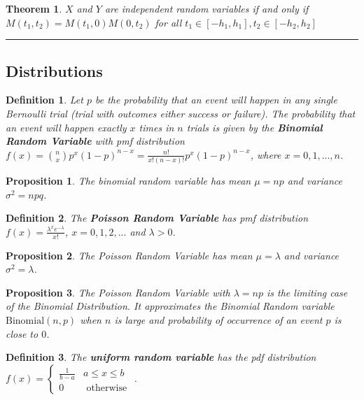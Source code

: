 \documentclass[14pt,twoside]{extreport}
\newcommand{\hhrule}{\vspace{1cm}\hrule\vspace{1cm}}
\theoremstyle{dotless}
\newtheorem*{defn}{Definition}
\newtheorem*{thm}{Theorem} %
\newtheorem*{prop}{Proposition} %
\begin{document}
\begin{thm}
    $X$ and $Y$ are independent random variables if and only if $M(t_1, t_2) = M(t_1, 0) M(0, t_2)$ for all $t_1 \in [-h_1, h_1], t_2 \in [-h_2, h_2]$
\end{thm}


\hhrule
\subsection*{Distributions}

\begin{defn}
    Let $p$ be the probability that an event will happen in any single Bernoulli trial (trial with outcomes either success or failure). The probability that an event will happen exactly $x$ times in $n$ trials is given by the \textbf{Binomial Random Variable} with pmf distribution $f(x) = {n \choose x} p^x (1-p)^{n-x} = \displaystyle \frac{n!}{x! (n-x)!} p^x (1-p)^{n-x}$, where $x = 0, 1, ... , n$.
\end{defn}

\begin{prop}
The binomial random variable has mean $\mu = np$ and variance $\sigma^2 = npq$.
\end{prop}

\begin{defn}
    The \textbf{Poisson Random Variable} has pmf distribution $f(x) = \displaystyle \frac{\lambda^x e^{-\lambda}}{x!}$, $x = 0, 1, 2, ...$ and $\lambda > 0$.
\end{defn}

\begin{prop}
The Poisson Random Variable has mean $\mu = \lambda$ and variance $\sigma^2 = \lambda$.
\end{prop}
\begin{prop}
    The Poisson Random Variable with $\lambda = np$ is the limiting case of the Binomial Distribution. It approximates the Binomial Random variable $\text{Binomial}(n,p)$ when $n$ is large and probability of occurrence of an event $p$ is close to $0$.
\end{prop}

\begin{defn}    
    The \textbf{uniform random variable} has the pdf distribution $f(x) = \begin{cases} \frac{1}{b-a} & a \leq x \leq b \\ 0 & \text { otherwise }\end{cases}$.
\end{defn}
\end{document}
